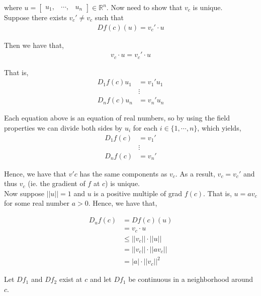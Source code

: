 \documentclass[12pt]{article}
\newenvironment{problem}[2][Problem]{\begin{trivlist}
\item[\hskip \labelsep {\bfseries #1}\hskip \labelsep {\bfseries #2.}]}{\end{trivlist}}
\begin{document}
where $u = \begin{bmatrix} u_1, & \cdots, & u_n \end{bmatrix} \in \mathbb{R}^n$. Now need to show that $v_c$ is unique.\\

Suppose there exists $v_c' \neq v_c$ such that
\begin{align*}
Df(c)(u) = v_c' \cdot u
\end{align*} 

Then we have that,
\begin{align*}
v_c \cdot u = v_c' \cdot u
\end{align*}

That is,
\begin{align*}
D_1f(c) u_1 &= v_1' u_1\\
&\vdots\\
D_nf(c) u_n &= v_n' u_n
\end{align*}

Each equation above is an equation of real numbers, so by using the field properties we can divide both sides by $u_i$ for each $i \in \{1, \cdots, n\}$, which yields,
\begin{align*}
D_1f(c) &= v_1' \\
&\vdots\\
D_nf(c) &= v_n' 
\end{align*}

Hence, we have that $v'c$ has the same components as $v_c$. As a result, $v_c = v_c'$ and thus $v_c$ (ie. the gradient of $f$ at $c$) is unique.\\

Now suppose $||u|| = 1$ and $u$ is a positive multiple of grad $f(c)$. That is, $u = a v_c$ for some real number $a > 0$. Hence, we have that,

\begin{align*}
D_uf(c) &= Df(c)(u)\\
&= v_c \cdot u\\
&\leq ||v_c|| \cdot ||u||\\
&= ||v_c|| \cdot ||av_c||\\
&= |a| \cdot ||v_c||^2
\end{align*}

\newpage
\begin{problem}{5}
\end{problem}

Let $Df_1$ and $Df_2$ exist at $c$ and let $Df_1$ be continuous in a neighborhood around $c$.
\end{document}
